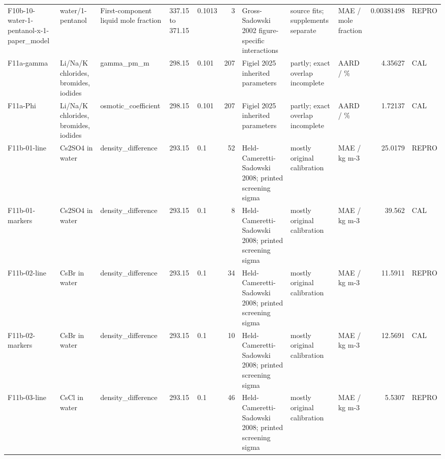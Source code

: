 \begin{landscape}
\begin{longtable}{L{1.9cm}L{2.5cm}L{2.1cm}L{1.6cm}L{1.6cm}rL{2.4cm}L{1.9cm}L{2.2cm}rL{1cm}}
F10b-\allowbreak{}10-\allowbreak{}water-\allowbreak{}1-\allowbreak{}pentanol-\allowbreak{}x-\allowbreak{}1-\allowbreak{}paper\_\allowbreak{}model & water/\allowbreak{}1-\allowbreak{}pentanol & First-\allowbreak{}component liquid mole fraction & 337.15 to 371.15 & 0.1013 & 3 & Gross-\allowbreak{}Sadowski 2002 figure-\allowbreak{}specific interactions & source fits; supplements separate & MAE /\allowbreak{} mole fraction & 0.00381498 & REPRO \\
F11a-\allowbreak{}gamma & Li/\allowbreak{}Na/\allowbreak{}K chlorides, bromides, iodides & gamma\_\allowbreak{}pm\_\allowbreak{}m & 298.15 & 0.101 & 207 & Figiel 2025 inherited parameters & partly; exact overlap incomplete & AARD /\allowbreak{} \% & 4.35627 & CAL \\
F11a-\allowbreak{}Phi & Li/\allowbreak{}Na/\allowbreak{}K chlorides, bromides, iodides & osmotic\_\allowbreak{}coefficient & 298.15 & 0.101 & 207 & Figiel 2025 inherited parameters & partly; exact overlap incomplete & AARD /\allowbreak{} \% & 1.72137 & CAL \\
F11b-\allowbreak{}01-\allowbreak{}line & Cs2SO4 in water & density\_\allowbreak{}difference & 293.15 & 0.1 & 52 & Held-\allowbreak{}Cameretti-\allowbreak{}Sadowski 2008; printed screening sigma & mostly original calibration & MAE /\allowbreak{} kg m-\allowbreak{}3 & 25.0179 & REPRO \\
F11b-\allowbreak{}01-\allowbreak{}markers & Cs2SO4 in water & density\_\allowbreak{}difference & 293.15 & 0.1 & 8 & Held-\allowbreak{}Cameretti-\allowbreak{}Sadowski 2008; printed screening sigma & mostly original calibration & MAE /\allowbreak{} kg m-\allowbreak{}3 & 39.562 & CAL \\
F11b-\allowbreak{}02-\allowbreak{}line & CsBr in water & density\_\allowbreak{}difference & 293.15 & 0.1 & 34 & Held-\allowbreak{}Cameretti-\allowbreak{}Sadowski 2008; printed screening sigma & mostly original calibration & MAE /\allowbreak{} kg m-\allowbreak{}3 & 11.5911 & REPRO \\
F11b-\allowbreak{}02-\allowbreak{}markers & CsBr in water & density\_\allowbreak{}difference & 293.15 & 0.1 & 10 & Held-\allowbreak{}Cameretti-\allowbreak{}Sadowski 2008; printed screening sigma & mostly original calibration & MAE /\allowbreak{} kg m-\allowbreak{}3 & 12.5691 & CAL \\
F11b-\allowbreak{}03-\allowbreak{}line & CsCl in water & density\_\allowbreak{}difference & 293.15 & 0.1 & 46 & Held-\allowbreak{}Cameretti-\allowbreak{}Sadowski 2008; printed screening sigma & mostly original calibration & MAE /\allowbreak{} kg m-\allowbreak{}3 & 5.5307 & REPRO \\

\end{longtable}
\end{landscape}
